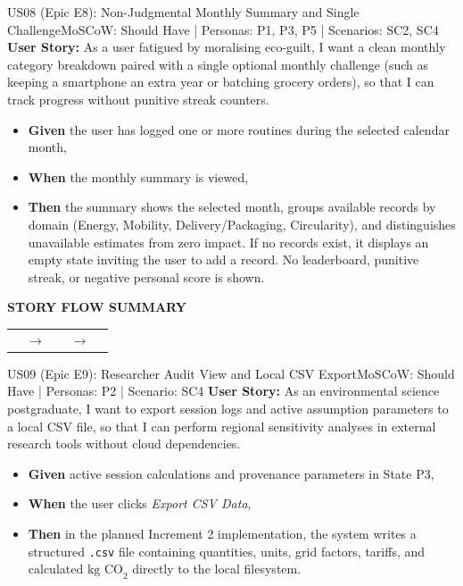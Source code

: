 \documentclass[12pt,a4paper]{article}
\makeatletter
\renewcommand{\arraystretch}{1.38}
\newcommand{\storyflow}[3]{%
  \par\Needspace{5\baselineskip}\vspace{0.08cm}%
  \begin{tcolorbox}[
    enhanced,width=\linewidth,
    colback=RowGray!72,colframe=RuleGray,
    boxrule=0.5pt,arc=1.2mm,
    borderline west={2pt}{0pt}{Teal},
    left=9pt,right=9pt,top=9pt,bottom=9pt,
    before skip=0pt,after skip=0pt
  ]
    {\sffamily\footnotesize\bfseries\color{Teal}STORY FLOW SUMMARY}\par
    \vspace{0.18cm}
    \renewcommand{\arraystretch}{1.0}%
    \begin{tabularx}{\linewidth}{@{}>{\centering\arraybackslash}X
      >{\centering\arraybackslash}p{0.52cm}
      >{\centering\arraybackslash}X
      >{\centering\arraybackslash}p{0.52cm}
      >{\centering\arraybackslash}X@{}}
      \fcolorbox{Teal!42}{white}{%
        \parbox[c][1.65cm][c]{\dimexpr\hsize-2\fboxsep-2\fboxrule\relax}{%
          \centering\sffamily\small\bfseries\color{Teal}01\par
          \vspace{3pt}\normalfont\small\color{Navy}#1}} &
      {\color{Teal}\normalsize$\to$} &
      \fcolorbox{Teal!42}{white}{%
        \parbox[c][1.65cm][c]{\dimexpr\hsize-2\fboxsep-2\fboxrule\relax}{%
          \centering\sffamily\small\bfseries\color{Teal}02\par
          \vspace{3pt}\normalfont\small\color{Navy}#2}} &
      {\color{Teal}\normalsize$\to$} &
      \fcolorbox{Teal!42}{white}{%
        \parbox[c][1.65cm][c]{\dimexpr\hsize-2\fboxsep-2\fboxrule\relax}{%
          \centering\sffamily\small\bfseries\color{Teal}03\par
          \vspace{3pt}\normalfont\small\color{Navy}#3}}
    \end{tabularx}
  \end{tcolorbox}
  \vspace{0.08cm}%
}
\makeatother
\begin{document}
\Needspace{0.30\textheight}
\begin{storybox}{US08 (Epic E8): Non-Judgmental Monthly Summary and Single Challenge}{MoSCoW: Should Have | Personas: P1, P3, P5 | Scenarios: SC2, SC4}
\textbf{User Story:} As a user fatigued by moralising eco-guilt, I want a clean monthly category breakdown paired with a single optional monthly challenge (such as keeping a smartphone an extra year or batching grocery orders), so that I can track progress without punitive streak counters.
\begin{itemize}
    \item \textbf{Given} the user has logged one or more routines during the selected calendar month,
    \item \textbf{When} the monthly summary is viewed,
    \item \textbf{Then} the summary shows the selected month, groups available records by domain (Energy, Mobility, Delivery/Packaging, Circularity), and distinguishes unavailable estimates from zero impact. If no records exist, it displays an empty state inviting the user to add a record. No leaderboard, punitive streak, or negative personal score is shown.
\end{itemize}
\end{storybox}
\storyflow{Show communal total by default}{Allow voluntary own-room view}{Review non-punitive month summary}

\clearpage
\Needspace{0.30\textheight}
\begin{storybox}{US09 (Epic E9): Researcher Audit View and Local CSV Export}{MoSCoW: Should Have | Personas: P2 | Scenario: SC4}
\textbf{User Story:} As an environmental science postgraduate, I want to export session logs and active assumption parameters to a local CSV file, so that I can perform regional sensitivity analyses in external research tools without cloud dependencies.
\begin{itemize}
    \item \textbf{Given} active session calculations and provenance parameters in State P3,
    \item \textbf{When} the user clicks \textit{Export CSV Data},
    \item \textbf{Then} in the planned Increment 2 implementation, the system writes a structured \texttt{.csv} file containing quantities, units, grid factors, tariffs, and calculated $\text{kg CO}_2$ directly to the local filesystem.
\end{itemize}
\end{storybox}
\end{document}
